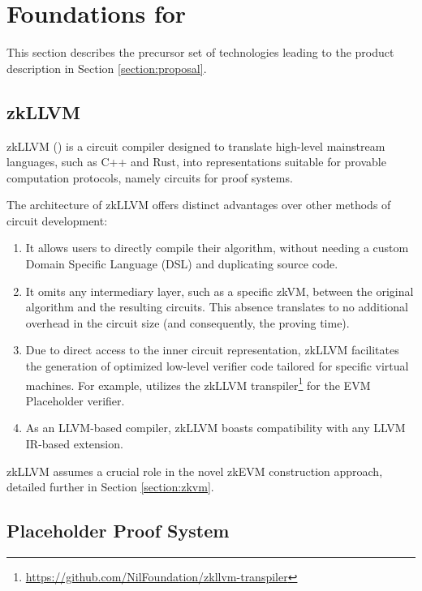 \section{Foundations for \protocol}
\label{section:preliminaries}

This section describes the precursor set of technologies leading to the
product description in Section \ref{section:proposal}.

\subsection{zkLLVM}

zkLLVM (\cite{zkllvm}) is a circuit compiler designed to translate high-level 
mainstream languages, such as C++ and Rust, into representations suitable for 
provable computation protocols, namely circuits for proof systems.

The architecture of zkLLVM offers distinct advantages over other 
methods of circuit development:
\begin{enumerate}
    \item It allows users to directly compile their algorithm,
        without needing a custom Domain Specific Language (DSL) 
        and duplicating source code.
    \item It omits any intermediary layer, such as a specific zkVM, 
        between the original algorithm and the resulting circuits. 
        This absence translates to no additional overhead in the circuit size 
        (and consequently, the proving time).
    \item Due to direct access to the inner circuit representation, zkLLVM facilitates 
        the generation of optimized low-level verifier code tailored for 
        specific virtual machines. 
        For example, \nil utilizes the zkLLVM transpiler\footnote{
            \url{https://github.com/NilFoundation/zkllvm-transpiler}} 
        for the EVM Placeholder verifier.
    \item As an LLVM-based compiler, zkLLVM boasts compatibility with any LLVM 
        IR-based extension.
\end{enumerate} 

zkLLVM assumes a crucial role in the novel zkEVM construction approach, 
detailed further in Section \ref{section:zkvm}.


\subsection{Placeholder Proof System}

